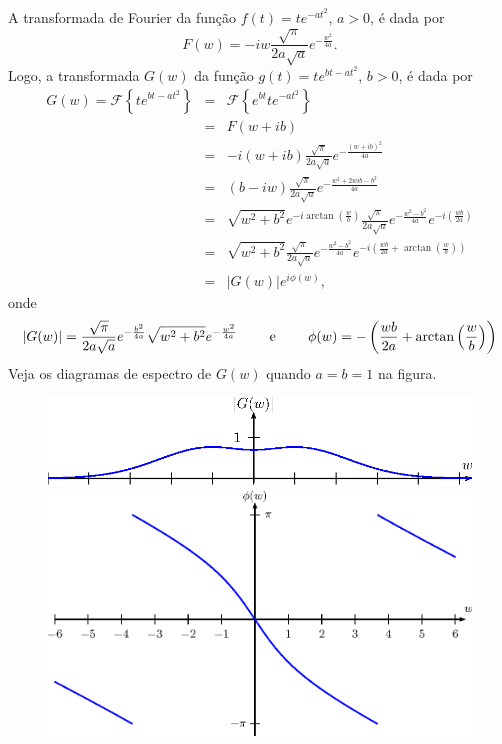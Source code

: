 \documentclass[a4paper,10pt]{book}
\begin{document}
A transformada de Fourier da função $f(t)=t e^{-at^2}$, $a>0$, é dada por
 \begin{equation}
 F(w)=-iw\frac{\sqrt{\pi}}{2a\sqrt{a}}e^{-\frac{w^2}{4a}}.
 \end{equation}
 Logo, a transformada $G(w)$ da função $g(t)=t e^{bt-at^2}$, $b>0$, é dada por
 \begin{eqnarray*}
 G(w)=\mathcal{F}\left\{t e^{bt-at^2}\right\}&=&\mathcal{F}\left\{e^{bt}t e^{-at^2}\right\}\\
 &=&F(w+ib)\\
 &=&-i(w+ib)\frac{\sqrt{\pi}}{2a\sqrt{a}}e^{-\frac{(w+ib)^2}{4a}}\\
 &=&(b-iw)\frac{\sqrt{\pi}}{2a\sqrt{a}}e^{-\frac{w^2+2wib-b^2}{4a}}\\
 &=&\sqrt{w^2+b^2}e^{-i\arctan\left(\frac{w}{b}\right)}\frac{\sqrt{\pi}}{2a\sqrt{a}}e^{-\frac{w^2-b^2}{4a}}e^{-i\left(\frac{wb}{2a}\right)}\\
 &=&\sqrt{w^2+b^2}\frac{\sqrt{\pi}}{2a\sqrt{a}}e^{-\frac{w^2-b^2}{4a}}e^{-i\left(\frac{wb}{2a}+\arctan\left(\frac{w}{b}\right)\right)}\\
 &=&|G(w)|e^{i\phi(w)},
 \end{eqnarray*}
 onde
 \begin{eqnarray*}
 |G(w)|=\frac{\sqrt{\pi}}{2a\sqrt{a}}e^{-\frac{b^2}{4a}}\sqrt{w^2+b^2}e^{-\frac{w^2}{4a}}\qquad\hbox{ e }\qquad \phi(w)=-\left(\frac{wb}{2a}+\arctan\left(\frac{w}{b}\right)\right)
 \end{eqnarray*}
 Veja os diagramas de espectro de $G(w)$ quando $a=b=1$ na figura.
 \begin{figure}[!ht]
 \begin{center}
 \includegraphics{figs/cap_propriedades_transformada_figura_2}
 \includegraphics{figs/cap_propriedades_transformada_figura_3}\end{center}
 \caption{\label{diag_espec_trans_4}}
 \end{figure}
\end{document}
